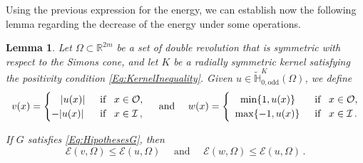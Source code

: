 \documentclass[12pt,reqno]{amsart}
\newtheorem{lemma}[theorem]{Lemma}
\theoremstyle{definition}
\theoremstyle{remark}
\newcommand{\con}[1]{\mathbb{#1}}
\newcommand{\R}{\con{R}} %
\renewcommand{\H}{\con{H}}
\newcommand{\ecal}{\mathcal{E}}
\newcommand{\ical}{\mathcal{I}}
\newcommand{\ocal}{\mathcal{O}}
\numberwithin{equation}{section}
\begin{document}
Using the previous expression for the energy, we can establish now the following lemma regarding the decrease of the energy under some operations.
\begin{lemma}
	\label{Lemma:DecreaseEnergy} 
	Let $\Omega\subset \R^{2m}$ be a set of double revolution that is symmetric with respect to the Simons cone, and let $K$ be a radially symmetric kernel satisfying the positivity condition \eqref{Eq:KernelInequality}. Given $u\in\widetilde{\H}^K_{0,\mathrm{odd}}(\Omega)$, we define
	\begin{equation*}
	v(x) = \begin{cases}
	\hspace{3.2mm}|u(x)| \,\,\, &\text{if } \,\,\, x\in\ocal,\\
	-|u(x)| \,\,\, &\text{if } \,\,\, x\in\ical\, ,
	\end{cases}
	\quad 
	\text{ and }
	\quad
	w(x) = \begin{cases}
	\hspace{3.6mm}\min\{1,u(x)\} \,\,\, &\text{if } \,\,\, x\in\ocal,\\
	\,\,\,\max\{-1,u(x)\} \,\,\, &\text{if } \,\,\, x\in\ical\,.
	\end{cases}
	\end{equation*}
	
	If $G$ satisfies \eqref{Eq:HipothesesG}, then
	$$ \ecal(v,\Omega) \leq \ecal(u,\Omega) \quad 
	\text{ and }
	\quad \ecal(w,\Omega) \leq \ecal(u,\Omega) \,.  $$
\end{lemma}
\end{document}
